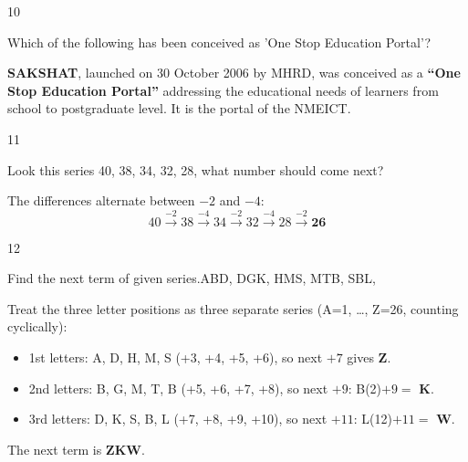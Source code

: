 \begin{question}{10}
{Which of the following has been conceived as 'One Stop Education Portal'?\par}
\begin{explain}
\textbf{SAKSHAT}, launched on 30 October 2006 by MHRD, was conceived as a \textbf{``One Stop Education Portal''} addressing the educational needs of learners from school to postgraduate level. It is the portal of the NMEICT.
\end{explain}
\end{question}

\begin{question}{11}
{Look this series 40, 38, 34, 32, 28, what number should come next?\par}
\begin{explain}
The differences alternate between $-2$ and $-4$:
\[40\xrightarrow{-2}38\xrightarrow{-4}34\xrightarrow{-2}32\xrightarrow{-4}28\xrightarrow{-2}\mathbf{26}\]
\end{explain}
\end{question}

\begin{question}{12}
{Find the next term of given series.\newline ABD, DGK, HMS, MTB, SBL, \blank{}\par}
\begin{explain}
Treat the three letter positions as three separate series (A=1, \ldots, Z=26, counting cyclically):
\begin{itemize}
\item 1st letters: A, D, H, M, S (+3, +4, +5, +6), so next $+7$ gives \textbf{Z}.
\item 2nd letters: B, G, M, T, B (+5, +6, +7, +8), so next $+9$: B(2)$+9=$ \textbf{K}.
\item 3rd letters: D, K, S, B, L (+7, +8, +9, +10), so next $+11$: L(12)$+11=$ \textbf{W}.
\end{itemize}
The next term is \textbf{ZKW}.
\end{explain}
\end{question}

